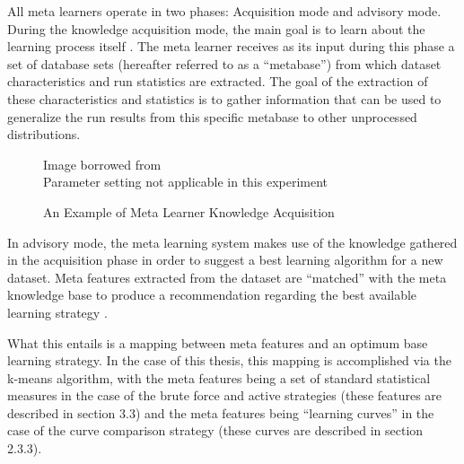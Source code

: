 All meta learners operate in two phases: Acquisition mode and advisory mode.
During the knowledge acquisition mode, the main goal is to learn about the
learning process itself \cite{Vilalta}. The meta learner receives as its input
during this phase a set of database sets (hereafter referred to as a ``metabase'')
from which dataset characteristics and run statistics are extracted. The goal
of the extraction of these characteristics and statistics is to gather
information that can be used to generalize the run results from this specific
metabase to other unprocessed distributions.

\begin{figure}[h]
\caption{An Example of Meta Learner Knowledge Acquisition}
\centering
Image borrowed from \cite{Vilalta} \\
Parameter setting not applicable in this experiment
\end{figure}

In advisory mode, the meta learning system makes use of the knowledge gathered in
the acquisition phase in order to suggest a best learning algorithm for a new
dataset. Meta features extracted from the dataset are ``matched'' with the
meta knowledge base to produce a recommendation regarding the best available
learning strategy \cite{Vilalta}.

What this entails is a mapping between meta features and an optimum base learning
strategy. In the case of this thesis, this mapping is accomplished via the k-means
algorithm, with the meta features being a set of standard statistical measures
in the case of the brute force and active strategies (these features are described
in section 3.3) and the meta features being ``learning curves'' in the case of the
curve comparison strategy (these curves are described in section 2.3.3).

